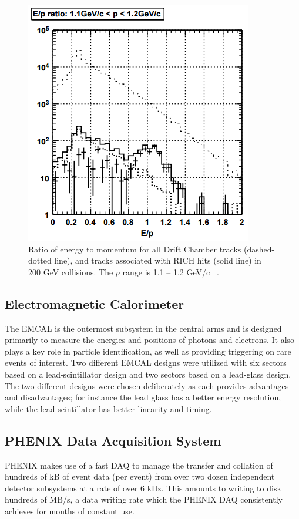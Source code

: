 \begin{figure}[!ht]
\centering
\includegraphics[width=0.55\linewidth]{figs/e_over_p_rich_discrimination.png}
\caption{Ratio of energy to momentum for all Drift Chamber tracks (dashed-dotted line), and tracks associated with RICH hits (solid line) in \auau \sqsn = 200 GeV collisions. The $p$ range is 1.1 -- 1.2 GeV/c ~\cite{Aizawa2003508}.}
\label{fig:rich_discrim_ep}
\end{figure}

\subsection{Electromagnetic Calorimeter}
The EMCAL is the outermost subsystem in the central arms and is designed primarily to measure the energies and positions of photons and electrons. It also plays a key role in particle identification, as well as providing triggering on rare events of interest. Two different EMCAL designs were utilized with six sectors based on a lead-scintillator design and two sectors based on a lead-glass design. The two different designs were chosen deliberately as each provides advantages and disadvantages; for instance the lead glass has a better energy resolution, while the lead scintillator has better linearity and timing.

\subsection{PHENIX Data Acquisition System}
\label{sec:PHENIX_DAQ}
PHENIX makes use of a fast DAQ to manage the transfer and collation of hundreds of kB of event data (per event) from over two dozen independent detector subsystems at a rate of over 6 kHz. This amounts to writing to disk hundreds of MB/s, a data writing rate which the PHENIX DAQ consistently achieves for months of constant use. 

